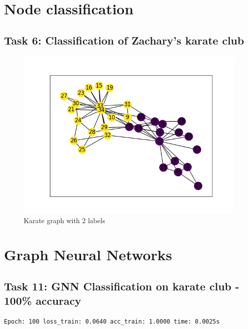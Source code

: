 \documentclass[a4paper]{article}
\begin{document}
\break

\section{Node classification}
\subsection*{Task 6: Classification of Zachary's karate club}

\begin{figure}[ht]
    \centering
    \includegraphics[width=1.\textwidth]{figures/labeled_karate_graph.png}
    \caption{Karate graph with 2 labels}
    \label{fig:karate_labeled}
\end{figure}

\section{Graph Neural Networks}
\subsection*{Task 11: GNN Classification on karate club - 100\% accuracy}
\begin{verbatim}
Epoch: 100 loss_train: 0.0640 acc_train: 1.0000 time: 0.0025s
\end{verbatim}


\end{document}
